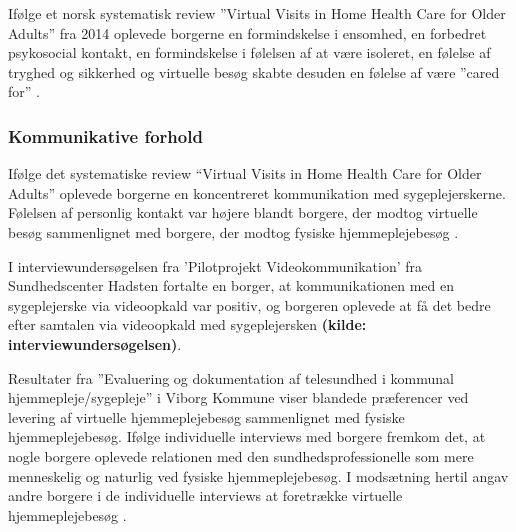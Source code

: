 Ifølge et norsk systematisk review ”Virtual Visits in Home Health Care for Older Adults” fra 2014 oplevede borgerne en formindskelse i ensomhed, en forbedret psykosocial kontakt, en formindskelse i følelsen af at være isoleret, en følelse af tryghed og sikkerhed og virtuelle besøg skabte desuden en følelse af være ”cared for” \cite{Baf2}.  

\subsubsection{Kommunikative forhold}
Ifølge det systematiske review “Virtual Visits in Home Health Care for Older Adults” oplevede borgerne en koncentreret kommunikation med sygeplejerskerne. Følelsen af personlig kontakt var højere blandt borgere, der modtog virtuelle besøg sammenlignet med borgere, der modtog fysiske hjemmeplejebesøg \cite{Baf2}. 

I interviewundersøgelsen fra ’Pilotprojekt Videokommunikation’ fra Sundhedscenter Hadsten fortalte en borger, at kommunikationen med en sygeplejerske via videoopkald var positiv, og borgeren oplevede at få det bedre efter samtalen via videoopkald med sygeplejersken \textbf{(kilde: interviewundersøgelsen)}. 

Resultater fra ”Evaluering og dokumentation af telesundhed i kommunal hjemmepleje/sygepleje” i Viborg Kommune viser blandede præferencer ved levering af virtuelle hjemmeplejebesøg sammenlignet med fysiske hjemmeplejebesøg. Ifølge individuelle interviews med borgere fremkom det, at nogle borgere oplevede relationen med den sundhedsprofessionelle som mere menneskelig og naturlig ved fysiske hjemmeplejebesøg. I modsætning hertil angav andre borgere i de individuelle interviews at foretrække virtuelle hjemmeplejebesøg \cite{kandidat}.

